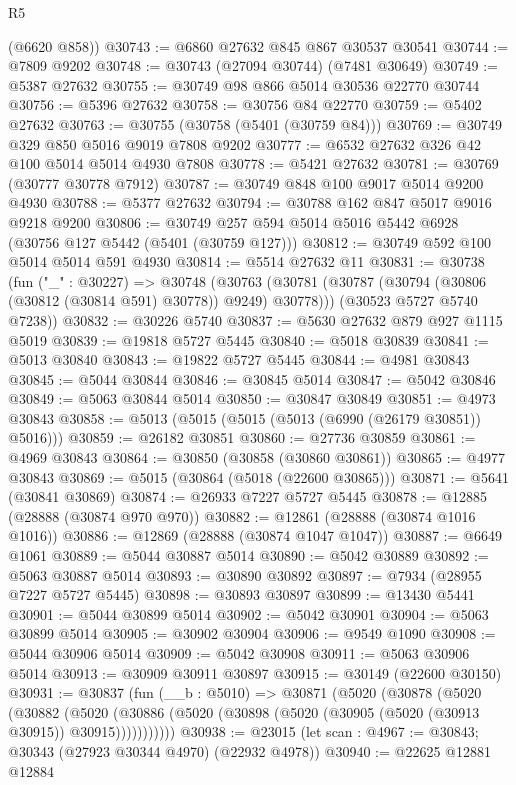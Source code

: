 \begin{lexlean}{R5}
\begin{coremodule}
      (@6620 @858))
@30743 := @6860 @27632 @845 @867 @30537 @30541
@30744 := @7809 @9202
@30748 := @30743 (@27094 @30744) (@7481 @30649)
@30749 := @5387 @27632
@30755 := @30749 @98 @866 @5014 @30536 @22770 @30744
@30756 := @5396 @27632
@30758 := @30756 @84 @22770
@30759 := @5402 @27632
@30763 := @30755 (@30758 (@5401 (@30759 @84)))
@30769 := @30749 @329 @850 @5016 @9019 @7808 @9202
@30777 := @6532 @27632 @326 @42 @100 @5014 @5014 @4930 @7808
@30778 := @5421 @27632
@30781 := @30769 (@30777 @30778 @7912)
@30787 := @30749 @848 @100 @9017 @5014 @9200 @4930
@30788 := @5377 @27632
@30794 := @30788 @162 @847 @5017 @9016 @9218 @9200
@30806 := @30749 @257 @594 @5014 @5016 @5442 @6928 (@30756 @127 @5442 (@5401 (@30759 @127)))
@30812 := @30749 @592 @100 @5014 @5014 @591 @4930
@30814 := @5514 @27632 @11
@30831 := @30738
    (fun ("_" : @30227) =>
    @30748
      (@30763 (@30781 (@30787 (@30794 (@30806 (@30812 (@30814 @591) @30778)) @9249) @30778)))
      (@30523 @5727 @5740 @7238))
@30832 := @30226 @5740
@30837 := @5630 @27632 @879 @927 @1115 @5019
@30839 := @19818 @5727 @5445
@30840 := @5018 @30839
@30841 := @5013 @30840
@30843 := @19822 @5727 @5445
@30844 := @4981 @30843
@30845 := @5044 @30844
@30846 := @30845 @5014
@30847 := @5042 @30846
@30849 := @5063 @30844 @5014
@30850 := @30847 @30849
@30851 := @4973 @30843
@30858 := @5013 (@5015 (@5015 (@5013 (@6990 (@26179 @30851)) @5016)))
@30859 := @26182 @30851
@30860 := @27736 @30859
@30861 := @4969 @30843
@30864 := @30850 (@30858 (@30860 @30861))
@30865 := @4977 @30843
@30869 := @5015 (@30864 (@5018 (@22600 @30865)))
@30871 := @5641 (@30841 @30869)
@30874 := @26933 @7227 @5727 @5445
@30878 := @12885 (@28888 (@30874 @970 @970))
@30882 := @12861 (@28888 (@30874 @1016 @1016))
@30886 := @12869 (@28888 (@30874 @1047 @1047))
@30887 := @6649 @1061
@30889 := @5044 @30887 @5014
@30890 := @5042 @30889
@30892 := @5063 @30887 @5014
@30893 := @30890 @30892
@30897 := @7934 (@28955 @7227 @5727 @5445)
@30898 := @30893 @30897
@30899 := @13430 @5441
@30901 := @5044 @30899 @5014
@30902 := @5042 @30901
@30904 := @5063 @30899 @5014
@30905 := @30902 @30904
@30906 := @9549 @1090
@30908 := @5044 @30906 @5014
@30909 := @5042 @30908
@30911 := @5063 @30906 @5014
@30913 := @30909 @30911 @30897
@30915 := @30149 (@22600 @30150)
@30931 := @30837
    (fun (__b : @5010) =>
    @30871
      (@5020
        (@30878
          (@5020
            (@30882
              (@5020 (@30886 (@5020 (@30898 (@5020 (@30905 (@5020 (@30913 @30915)) @30915)))))))))))
@30938 := @23015 (let scan : @4967 := @30843; @30343 (@27923 @30344 @4970) (@22932 @4978))
@30940 := @22625 @12881 @12884

\end{coremodule}
\end{lexlean}
